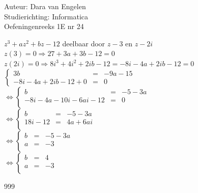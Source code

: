 \documentclass[a4paper]{article}
\begin{document}
  
\noindent \large Auteur: Dara van Engelen \\
\noindent \large Studierichting: Informatica\\
\noindent \large Oefeningenreeks 1E nr 24\\

\medskip

\normalsize

$ z^3 + az^2 + bz -12 $ deelbaar door  $ z-3 $ en $z-2i$\\

$ z(3) = 0 \Rightarrow 27 + 3a + 3b -12 = 0$\\

$ z(2i) = 0 \Rightarrow 8i^3 + 4i^2 + 2ib -12 = -8i-4a + 2ib -12 = 0$\\

$\left\{
	\begin{array}{lll} 
	    3b &=& -9a - 15 \\ 
		-8i -4a + 2ib -12 + 0 &=& 0
	\end{array}
\right .$\\

$\Leftrightarrow\left\{
	\begin{array}{lll} 
		b &=& -5 -3a\\
		-8i -4a -10i - 6ai -12 &=& 0\\
	\end{array}
\right .$\\

$\Leftrightarrow\left\{
	\begin{array}{lll} 
		b &=& -5-3a\\
		18i -12 &=& 4a +6ai\\
	\end{array}
\right .$\\

$\Leftrightarrow\left\{
	\begin{array}{lll} 
		b &=& -5-3a\\
		a &=&  -3\\
	\end{array}
\right .$\\

$\Leftrightarrow\left\{
	\begin{array}{lll} 
		b &=& 4\\
		a &=& -3\\
	\end{array}
\right .$\\

\begin{thebibliography}{999}
\end{thebibliography}
\end{document}
